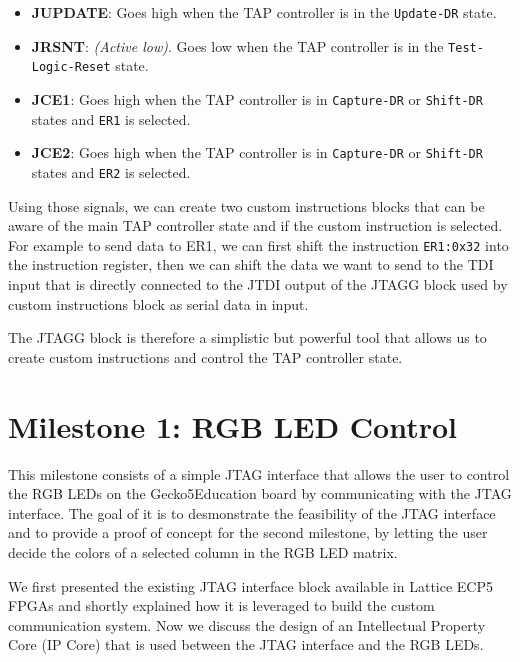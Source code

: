 \documentclass[a4paper,11pt,oneside]{report}
\newcommand{\boardName}{Gecko5Education \xspace}
\begin{document}
\begin{itemize}
\begin{itemize}
        \item \textbf{JUPDATE}: Goes high when the TAP controller is in the \texttt{Update-DR} state.
        
        \item \textbf{JRSNT}: \emph{(Active low)}. Goes low when the TAP controller is in the 
        \texttt{Test-Logic-Reset} state.
        
        \item \textbf{JCE1}: Goes high when the TAP controller is in \texttt{Capture-DR} or 
        \texttt{Shift-DR} states and \texttt{ER1} is selected.

        \item \textbf{JCE2}: Goes high when the TAP controller is in \texttt{Capture-DR} or 
        \texttt{Shift-DR} states and \texttt{ER2} is selected.
    \end{itemize}
\end{itemize}

Using those signals, we can create two custom instructions blocks that can be aware of the main TAP controller state and if the custom instruction is selected.
For example to send data to ER1, we can first shift the instruction \texttt{ER1:0x32} into the instruction register, then we can shift the data we want to send 
to the TDI input that is directly connected to the JTDI output of the JTAGG block used by custom instructions block as serial data in input.

The JTAGG block is therefore a simplistic but powerful tool that allows us to create custom instructions and control the TAP controller state.\\

\section{Milestone 1: RGB LED Control}

This milestone consists of a simple JTAG interface that allows the user to control the RGB LEDs on the \boardName board by communicating with the JTAG interface.
The goal of it is to desmonstrate the feasibility of the JTAG interface and to provide a proof of concept for the second milestone, by 
letting the user decide the colors of a selected column in the RGB LED matrix.

We first presented the existing JTAG interface block available in Lattice ECP5 FPGAs 
and shortly explained how it is leveraged to build the custom communication system.  
Now we discuss the design of an Intellectual Property Core (IP Core) that is used between the JTAG interface and the
RGB LEDs.  
\end{document}
